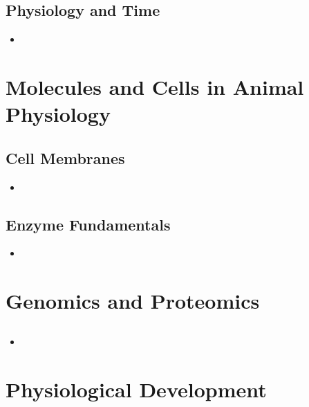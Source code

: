 \documentclass[12pt,a4paper]{article}
\begin{document}
\subsection{Physiology and Time}
\begin{itemize}
    \item 
\end{itemize}

\clearpage
\section{Molecules and Cells in Animal Physiology}
\subsection{Cell Membranes}
\begin{itemize}
    \item 
\end{itemize}

\subsection{Enzyme Fundamentals}
\begin{itemize}
    \item 
\end{itemize}

\clearpage
\section{Genomics and Proteomics}
\subsection{}
\begin{itemize}
    \item 
\end{itemize}

\clearpage
\section{Physiological Development}
\end{document}
